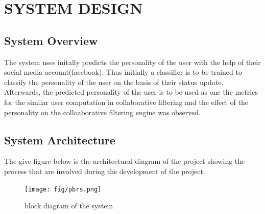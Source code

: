 \newpage
\section{SYSTEM DESIGN}

\subsection{System Overview}
The system uses initally predicts the personality of the user with the help of their social media account(facebook). Thus initially a classifier is to be trained to classify the personality of the user on the basis of their status update. Afterwards, the predicted personality of the user is to be used as one the metrics for the similar user computation in collaborative filtering and the effect of the personality on the colloaborative filtering engine was observed.

\subsection{System Architecture}
The give figure below is the architectural diagram of the project showing the process that are involved during the development of the project.

\begin{figure}[!ht]
\centering
\texttt{[image: fig/pbrs.png]}
\caption{block diagram of the system}
\label{fig:project}
\end{figure}


